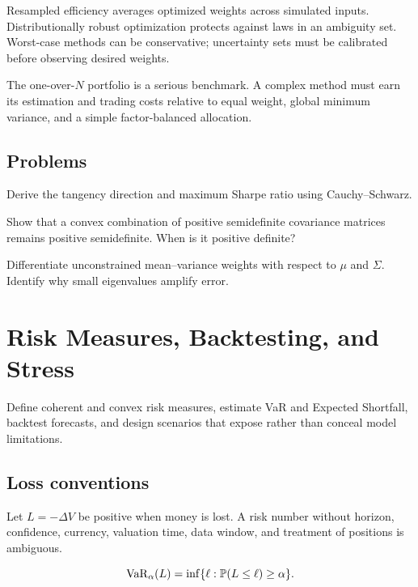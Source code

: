 Resampled efficiency averages optimized weights across simulated inputs. Distributionally
robust optimization protects against laws in an ambiguity set. Worst-case methods
can be conservative; uncertainty sets must be calibrated before observing desired
weights.

The one-over-$N$ portfolio is a serious benchmark. A complex method must earn its
estimation and trading costs relative to equal weight, global minimum variance, and
a simple factor-balanced allocation.

\section{Problems}

\begin{exercise}
Derive the tangency direction and maximum Sharpe ratio using Cauchy--Schwarz.
\end{exercise}
\begin{exercise}
Show that a convex combination of positive semidefinite covariance matrices remains
positive semidefinite. When is it positive definite?
\end{exercise}
\begin{exercise}
Differentiate unconstrained mean--variance weights with respect to $\mu$ and
$\Sigma$. Identify why small eigenvalues amplify error.
\end{exercise}


\chapter{Risk Measures, Backtesting, and Stress}

\begin{objectives}
Define coherent and convex risk measures, estimate VaR and Expected Shortfall,
backtest forecasts, and design scenarios that expose rather than conceal model
limitations.
\end{objectives}

\section{Loss conventions}

Let $L=-\Delta V$ be positive when money is lost. A risk number without horizon,
confidence, currency, valuation time, data window, and treatment of positions is
ambiguous.

\begin{definition}
\[
\operatorname{VaR}_\alpha(L)=\inf\{\ell:\mathbb P(L\leq\ell)\geq\alpha\}.
\]
\end{definition}

